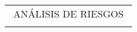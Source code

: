 \begin{adjustbox}{angle=90, captionbelow={DFMEA (Parte 3).}, float={table}[H]}

\setlength\arrayrulewidth{0.5pt}
\centering
\begin{tabular}{|ccccccccccccc|}
\hline
\multicolumn{13}{|c|}{ANÁLISIS DE RIESGOS}                                                                                                                                                                                                                                                                                                                                                                                                                                                                                                                                                                                                                                                                                                                                                                                                                                                                                                                                                                                                          \\
\multicolumn{1}{|l}{}                                              & \multicolumn{1}{l}{}                                                                                                      & \multicolumn{1}{l}{}                                                                                                      & \multicolumn{1}{l}{}                                                                                                                       & \multicolumn{1}{l}{}                            & \multicolumn{1}{l}{}                            & \multicolumn{1}{l}{}                            & \multicolumn{1}{l}{}                            & \multicolumn{1}{l}{}                                                                                                                                                           & \multicolumn{1}{l}{}                            & \multicolumn{1}{l}{}                            & \multicolumn{1}{l}{}                            & \multicolumn{1}{l|}{}      \\ \cline{2-8}

\end{tabular}
\end{adjustbox}
